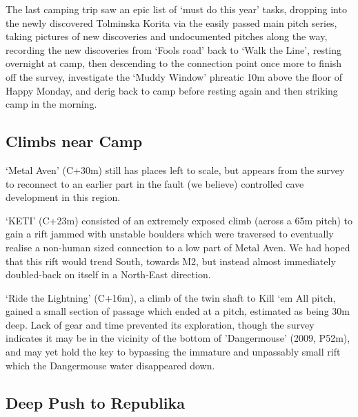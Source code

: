 The last camping trip saw an epic list of `must do this year' tasks,
dropping into the newly discovered Tolminska Korita via the easily
passed main pitch series, taking pictures of new discoveries and
undocumented pitches along the way, recording the new discoveries from
`Fools road' back to `Walk the Line', resting overnight at camp, then
descending to the connection point once more to finish off the survey,
investigate the `Muddy Window' phreatic 10m above the floor of Happy
Monday, and derig back to camp before resting again and then striking
camp in the morning.

\hypertarget{climbs-near-camp}{%
\subsection{Climbs near Camp}\label{climbs-near-camp}}

`Metal Aven' (C+30m) still has places left to scale, but appears from
the survey to reconnect to an earlier part in the fault (we believe)
controlled cave development in this region.

`KETI' (C+23m) consisted of an extremely exposed climb (across a 65m
pitch) to gain a rift jammed with unstable boulders which were traversed
to eventually realise a non-human sized connection to a low part of
Metal Aven. We had hoped that this rift would trend South, towards M2,
but instead almost immediately doubled-back on itself in a North-East
direction.

`Ride the Lightning' (C+16m), a climb of the twin shaft to Kill `em All
pitch, gained a small section of passage which ended at a pitch,
estimated as being 30m deep. Lack of gear and time prevented its
exploration, though the survey indicates it may be in the vicinity of
the bottom of 'Dangermouse' (2009, P52m), and may yet hold the key to
bypassing the immature and unpassably small rift which the Dangermouse
water disappeared down.

\hypertarget{deep-push-to-republika}{%
\subsection{Deep Push to Republika}\label{deep-push-to-republika}}

